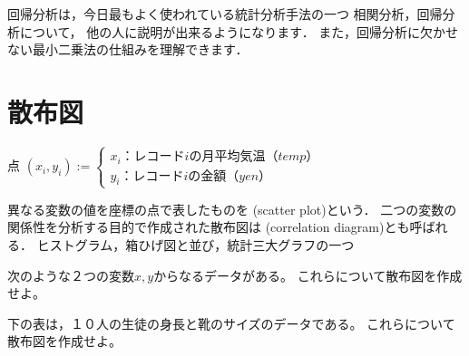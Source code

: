 \newcommand{\Release}{}
\newcommand{\Slide}{}
\newcommand{\PrintLecture}{1}
\newcommand{\PrintSolution}{1}








\maketitle

\MyFrame{}{\tableofcontents}

\note
{
  回帰分析は，今日最もよく使われている統計分析手法の一つ
  相関分析，回帰分析について，
  他の人に説明が出来るようになります．
  また，回帰分析に欠かせない最小二乗法の仕組みを理解できます．
}

\section{散布図}

\MyFrame{}
{
}

\MyFrame{}
{
}

{
  点 $(x_i, y_i):=
  \begin{cases}
    x_i：レコードiの月平均気温（temp）\\
    y_i：レコードiの金額（yen）
  \end{cases}$
}

\MyFrame{}
{
  {
    異なる変数の値を座標の点で表したものを
    (scatter plot)という．
    二つの変数の関係性を分析する目的で作成された散布図は
    (correlation diagram)とも呼ばれる．
    ヒストグラム，箱ひげ図と並び，統計三大グラフの一つ
  }
}

{
  \MyProblem
  {
    次のような２つの変数$x,y$からなるデータがある。
    これらについて散布図を作成せよ。
  }
}

{
  \MySolution
  {
  }
}

{
  \MyProblem
  {
    下の表は，１０人の生徒の身長と靴のサイズのデータである。
    これらについて散布図を作成せよ。
  }
}

